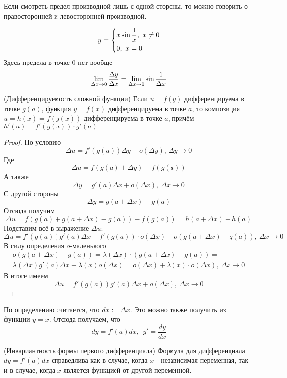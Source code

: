 \begin{note}
	Если смотреть предел производной лишь с одной стороны, то можно говорить о правосторонней и левосторонней производной.
\end{note}

\begin{example}
	\[
		y = \left\{\begin{aligned}&{x \sin \frac{1}{x},\ x \neq 0} \\ &{0,\ x = 0}\end{aligned}\right.
	\]
	Здесь предела в точке 0 нет вообще
	\[
		\lim\limits_{\Delta x \to 0} \frac{\Delta y}{\Delta x} = \lim\limits_{\Delta x \to 0} \sin \frac{1}{\Delta x}
	\]
\end{example}

\begin{theorem} (Дифференцируемость сложной функции)
	Если $u = f(y)$ дифференцируема в точке $g(a)$, функция $y = f(x)$ дифференцируема в точке $a$, то композиция $u = h(x) = f(g(x))$ дифференцируема в точке $a$, причём $h'(a) = f'(g(a)) \cdot g'(a)$
\end{theorem}

\begin{proof}
	По условию
	$$
		\Delta u = f'(g(a))\Delta y + o(\Delta y),\ \Delta y \to 0
	$$
	Где 
	$$
		\Delta u = f(g(a) + \Delta y) - f(g(a))
	$$
	А также
	$$
		\Delta y = g'(a)\Delta x + o(\Delta x),\ \Delta x \to 0
	$$
	С другой стороны
	$$
		\Delta y = g(a + \Delta x) - g(a)
	$$
	Отсюда получим
	$$
		\Delta u = f(g(a) + g(a + \Delta x) - g(a)) - f(g(a)) = h(a + \Delta x) - h(a)
	$$
	Подставим всё в выражение $\Delta u$:
	$$
		\Delta u = f'(g(a))g'(a)\Delta x + f'(g(a)) \cdot o(\Delta x) + o(g(a + \Delta x) - g(a)),\ \Delta x \to 0
	$$
	В силу определения $o$-маленького
	\begin{multline*}
		o(g(a + \Delta x) - g(a)) = \lambda(\Delta x) \cdot \left(g(a + \Delta x) - g(a)\right) = \\
		\lambda(\Delta x)g'(a)\Delta x + \lambda(x)o(\Delta x) = o(\Delta x) + \lambda(x) \cdot o(\Delta x),\ \Delta x \to 0
	\end{multline*}
	В итоге имеем
	$$
		\Delta u = f'(g(a))g'(a)\Delta x + o(\Delta x),\ \Delta x \to 0
	$$
\end{proof}

\begin{note}
	По определению считается, что $dx := \Delta x$. Это можно также получить из функции $y = x$. Отсюда получаем, что
	$$
		dy = f'(a)dx,\ \ y' = \frac{dy}{dx} 
	$$
\end{note}

\begin{corollary} (Инвариантность формы первого дифференциала)
	Формула для дифференциала $dy = f'(a)dx$ справедлива как в случае, когда $x$ - независимая переменная, так и в случае, когда $x$ является функцией от другой переменной.
\end{corollary}

